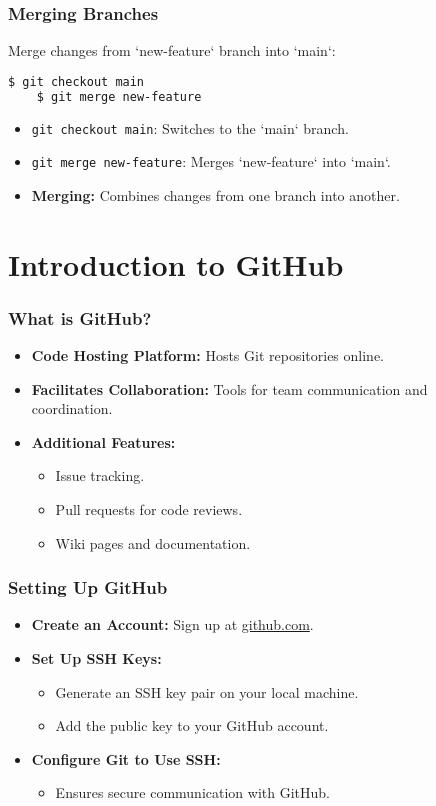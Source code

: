 \begin{frame}[fragile]
	\frametitle{Merging Branches}
	Merge changes from `new-feature` branch into `main`:
	\begin{lstlisting}[language=bash]
	$ git checkout main
	$ git merge new-feature
	\end{lstlisting}
	\begin{itemize}
		\item \texttt{git checkout main}: Switches to the `main` branch.
		\item \texttt{git merge new-feature}: Merges `new-feature` into `main`.
		\item \textbf{Merging:} Combines changes from one branch into another.
	\end{itemize}
\end{frame}

\section{Introduction to GitHub}

\begin{frame}
	\frametitle{What is GitHub?}
	\begin{itemize}
		\item \textbf{Code Hosting Platform:} Hosts Git repositories online.
		\item \textbf{Facilitates Collaboration:} Tools for team communication and coordination.
		\item \textbf{Additional Features:}
		\begin{itemize}
			\item Issue tracking.
			\item Pull requests for code reviews.
			\item Wiki pages and documentation.
		\end{itemize}
	\end{itemize}
\end{frame}

\begin{frame}
	\frametitle{Setting Up GitHub}
	\begin{itemize}
		\item \textbf{Create an Account:} Sign up at \href{https://github.com}{github.com}.
		\item \textbf{Set Up SSH Keys:}
		\begin{itemize}
			\item Generate an SSH key pair on your local machine.
			\item Add the public key to your GitHub account.
		\end{itemize}
		\item \textbf{Configure Git to Use SSH:}
		\begin{itemize}
			\item Ensures secure communication with GitHub.
		\end{itemize}
	\end{itemize}
\end{frame}

